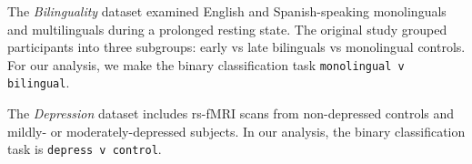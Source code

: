 \documentclass[12pt]{spieman}  %
\newcommand{\code}[1]{\small\texttt{#1}\normalsize}
\begin{document}
\begin{spacing}{2}

The \textit{Bilinguality} dataset\cite{ds001747:1.0.0,
goldcarrieelizabethExploringRestingState2018} examined English and
Spanish-speaking monolinguals and multilinguals during a prolonged resting
state. The original study grouped participants into three subgroups: early vs
late bilinguals vs monolingual
controls\cite{goldcarrieelizabethExploringRestingState2018}. For our analysis,
we make the binary classification task \code{monolingual v
bilingual}.



The \textit{Depression} dataset\cite{bezmaternykhddRestingStateClosed2021,
bezmaternykhBrainNetworksConnectivity2021} includes rs-fMRI scans from
non-depressed controls and mildly- or moderately-depressed subjects. In our analysis,
the binary classification task is \code{depress v control}.




\end{spacing}
\end{document}
